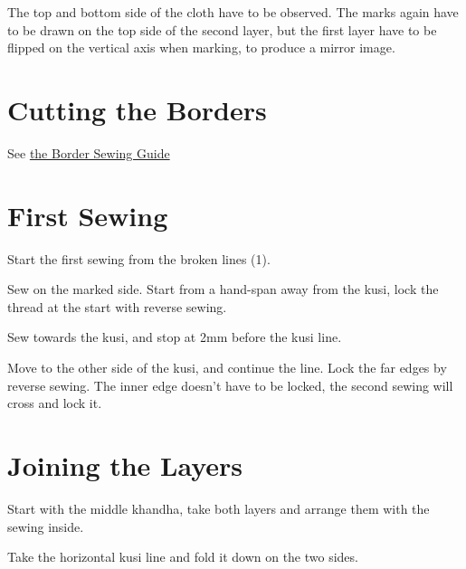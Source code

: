 The top and bottom side of the cloth have to be observed. The marks
again have to be drawn on the top side of the second layer, but the
first layer have to be flipped on the vertical axis when marking, to
produce a mirror image.

\setlength{\nextPhotoWidth}{0.6\textwidth}


\section{Cutting the Borders}

See \href{/en/borders}{the Border Sewing Guide}

\section{First Sewing}

Start the first sewing from the broken lines (1).

\setlength{\nextPhotoWidth}{0.5\textwidth}


\setlength{\nextPhotoWidth}{0.5\textwidth}


Sew on the marked side. Start from a hand-span away from the kusi, lock
the thread at the start with reverse sewing.

Sew towards the kusi, and stop at 2mm before the kusi line.

Move to the other side of the kusi, and continue the line. Lock the far
edges by reverse sewing. The inner edge doesn't have to be locked, the
second sewing will cross and lock it.

\setlength{\nextPhotoWidth}{0.5\textwidth}


\section{Joining the Layers}

Start with the middle khandha, take both layers and arrange them with
the sewing inside.

Take the horizontal kusi line and fold it down on the two sides.

\setlength{\nextPhotoWidth}{0.5\textwidth}

